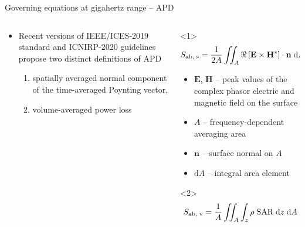 \documentclass[xcolor=dvipsnames,10pt]{beamer}
\begin{document}
\begin{frame}{Governing equations at gigahertz range -- APD}
    \begin{columns}[c]
        \begin{column}{0.4\textwidth}
            \begin{itemize}
                \item Recent versions of IEEE/ICES-2019 standard and ICNIRP-2020 guidelines propose two distinct definitions of APD
                \begin{enumerate}
                    \item<1> spatially averaged normal component of the time-averaged Poynting vector,
                    \item<2> volume-averaged power loss
                \end{enumerate}
            \end{itemize}
        \end{column} 
        \begin{column}{0.6\textwidth}
            \begin{onlyenv}<1>
                \begin{equation*}
                    \centering
                        S_\text{ab, s} = \frac{1}{2A} \iint_{A} \Re \left[ \mathbf{E} \times \mathbf{H}^* \right] \cdot \mathbf{n} \; \mathrm{d}A
                \end{equation*}
                \begin{itemize}
                    \item $\mathbf{E}$, $\mathbf{H}$ -- peak values of the complex phasor electric and magnetic field on the surface
                    \item $A$ -- frequency-dependent averaging area
                    \item $\mathbf{n}$ -- surface normal on $A$
                    \item $\mathrm{d}A$ -- integral area element
                \end{itemize}
            \end{onlyenv}
            \begin{onlyenv}<2>
                \begin{equation*}
                    \centering
                    S_\text{ab, v} = \frac{1}{A} \iint_{A} \int_{z} \rho \; \text{SAR} \; \mathrm{d}z \; \mathrm{d}A
                \end{equation*}


\end{onlyenv}
\end{column}
\end{columns}
\end{frame}
\end{document}
